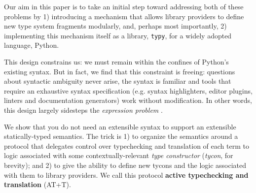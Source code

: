 \documentclass{sigplanconf}
\begin{document}

Our aim in this paper is to take an initial step toward addressing both of these problems by 1) introducing a mechanism that allows library providers to define new type system fragments modularly, and, perhaps most importantly, 2) implementing this mechanism itself as a library, \texttt{typy}, for a widely adopted language, Python. %

This design constrains us: we must remain within the confines of Python's existing syntax. But in fact, we find that this constraint is freeing: questions about syntactic ambiguity never arise, the syntax is familiar and tools that require an exhaustive syntax specification (e.g. syntax highlighters, editor plugins, linters and documentation generators)  work without modification. In other words, this design largely sidesteps the \emph{expression problem} \cite{wadler1998expression}.%

We show that you do not need an extensible syntax to support an extensible statically-typed  semantics. The trick is 1) to organize the semantics around a protocol that delegates control over typechecking and translation of each term to logic associated with some contextually-relevant \emph{type constructor} (\emph{tycon}, for brevity); and 2) to give the ability to define new tycons and the logic associated with them to library providers. We call this protocol \textbf{active typechecking and translation} (AT+T).
\end{document}
